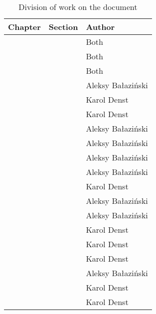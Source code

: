 \begin{table}[h]
    \centering
    \begin{tabular}{|l|l|l|}
    \hline
    Chapter  & Section    & Author        \\ \hline
    \nameref{ch:introduction} &  & Both \\
    \nameref{ch:division_of_work} &  & Both \\
    \nameref{ch:functional_specification} & & Both \\
    \nameref{ch:theoretical_foundations} & \nameref{sec:non_euclidean_geometry} & Aleksy Bałaziński      \\
    \nameref{ch:theoretical_foundations} & \nameref{sec:theory_theory_marching_cubes} & Karol Denst      \\
    \nameref{ch:theoretical_foundations} & \nameref{sec:theory_theory_models} & Karol Denst      \\
    \nameref{ch:theoretical_foundations} & \nameref{sec:theory_theory_day_night_cycle} & Aleksy Bałaziński      \\
    \nameref{ch:theoretical_foundations} & \nameref{sec:theory_theory_lighting} & Aleksy Bałaziński      \\
    \nameref{ch:implementation} & \nameref{sec:technologies_selection} & Aleksy Bałaziński      \\
    \nameref{ch:implementation} & \nameref{sec:game_objects_management} & Aleksy Bałaziński      \\
    \nameref{ch:implementation} & \nameref{sec:implementation_terrain} & Karol Denst      \\
    \nameref{ch:implementation} & \nameref{sec:chunk-worker} & Aleksy Bałaziński      \\
    \nameref{ch:implementation} & \nameref{sec:implementation_rendering} & Aleksy Bałaziński      \\
    \nameref{ch:implementation} & \nameref{sec:two_dimensional_graphics} & Karol Denst      \\
    \nameref{ch:testing} & & Karol Denst \\
    \nameref{ch:user_manual} & & Karol Denst \\
    \nameref{ch:results} & & Aleksy Bałaziński \\
    \nameref{ch:problems} & & Karol Denst \\
    \nameref{ch:improvements} & & Karol Denst \\
    \hline
    \end{tabular}
    \caption{Division of work on the document}
    \label{tab:division_of_work_on_the_document}
\end{table}